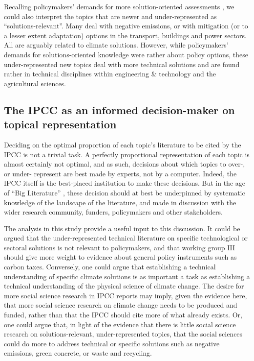 \documentclass{article}
\begin{document}
\begin{linenumbers}
Recalling policymakers' demands for more solution-oriented assessments \cite{Kowarsch2017}, we could also interpret the topics that are newer and under-represented as ``solutions-relevant''. Many deal with negative emissions, or with mitigation (or to a lesser extent adaptation) options in the transport, buildings and power sectors. All are arguably related to climate solutions. However, while policymakers' demands for solutions-oriented knowledge were rather about policy options, these under-represented new topics deal with more technical solutions and are found rather in technical disciplines within engineering \& technology and the agricultural sciences.

\subsection*{The IPCC as an informed decision-maker on topical representation}

Deciding on the optimal proportion of each topic's literature to be cited by the IPCC is not a trivial task. A perfectly proportional representation of each topic is almost certainly not optimal, and as such, decisions about which topics to over-, or under- represent are best made by experts, not by a computer. Indeed, the IPCC itself is the best-placed institution to make these decisions. But in the age of ``Big Literature'' \cite{Nunez-Mir2016}, these decision should at best be underpinned by systematic knowledge of the landscape of the literature, and made in discussion with the wider research community, funders, policymakers and other stakeholders.

The analysis in this study provide a useful input to this discussion. It could be argued that the under-represented technical literature on specific technological or sectoral solutions is not relevant to policymakers, and that working group III should give more weight to evidence about general policy instruments such as carbon taxes. Conversely, one could argue that establishing a technical understanding of specific climate solutions is as important a task as establishing a technical understanding of the physical science of climate change. The desire for more social science research in IPCC reports may imply, given the evidence here, that more social science research on climate change needs to be produced and funded, rather than that the IPCC should cite more of what already exists. Or, one could argue that, in light of the evidence that there is little social science research on solutions-relevant, under-represented topics, that the social sciences could do more to address technical or specific solutions such as negative emissions, green concrete, or waste and recycling.


\end{linenumbers}
\end{document}
